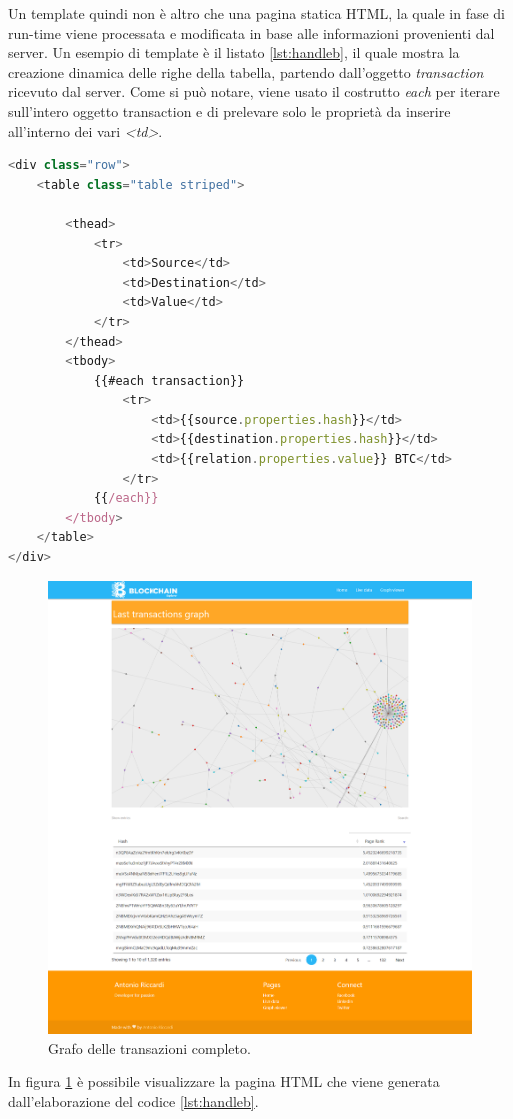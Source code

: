 \begin{itemize}
Un template quindi non è altro che una pagina statica HTML, la quale in fase di run-time viene processata e modificata in base alle informazioni provenienti dal server. Un esempio di template è il listato \ref{lst:handleb}, il quale mostra la creazione dinamica delle righe della tabella, partendo dall'oggetto \textit{transaction} ricevuto dal server. Come si può notare, viene usato il costrutto \textit{each} per iterare sull'intero oggetto transaction e di prelevare solo le proprietà da inserire all'interno dei vari \textit{<td>}.

\begin{lstlisting}[language=Javascript, label=lst:handleb, caption={Template Handlebars.}]
<div class="row">
    <table class="table striped">

        <thead>
            <tr>
                <td>Source</td>
                <td>Destination</td>
                <td>Value</td>
            </tr>
        </thead>
        <tbody>
            {{#each transaction}}
                <tr>
                    <td>{{source.properties.hash}}</td>
                    <td>{{destination.properties.hash}}</td>
                    <td>{{relation.properties.value}} BTC</td>
                </tr>
            {{/each}}
        </tbody>
    </table>
</div>
\end{lstlisting}


\begin{figure}[H]
	\centering
	\includegraphics[width=\textwidth, height=0.80\textheight]{images/graphView.png}
	\caption{Grafo delle transazioni completo.}
	\label{fig:graphView}
\end{figure}
In figura \ref{fig:graphView} è possibile visualizzare la pagina HTML che viene generata dall'elaborazione del codice \ref{lst:handleb}. 

\end{itemize}